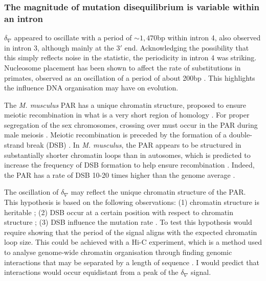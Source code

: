 
\subsubsection{The magnitude of mutation disequilibrium is variable within an intron}

$\delta_\nabla$ appeared to oscillate with a period of $\sim1,470$bp within intron 4, also observed in intron 3, although mainly at the $3'$ end. Acknowledging the possibility that this simply reflects noise in the statistic, the periodicity in intron 4 was striking. Nucleosome placement has been shown to affect the rate of substitutions in primates, observed as an oscillation of a period of about 200bp \citep{Ying2010EvidenceRepair}. This highlights the influence DNA organisation may have on evolution. 

The \textit{M. musculus} PAR has a unique chromatin structure, proposed to ensure meiotic recombination in what is a very short region of homology \citep{Kauppi2011DistinctMeiosis}. For proper segregation of the sex chromosomes, crossing over must occur in the PAR during male meiosis \citep{Burgoyne1982GeneticMammals, Ellis1989TheRegion, Rappold1993TheChromosomes}. Meiotic recombination is preceded by the formation of a double-strand break (DSB) \citep{Keeney2001MechanismInitiation}. In \textit{M. musculus}, the PAR appears to be structured in substantially shorter chromatin loops than in autosomes, which is predicted to increase the frequency of DSB formation to help ensure recombination \citep{Kauppi2011DistinctMeiosis, Acquaviva2020EnsuringRegion}. Indeed, the PAR has a rate of DSB 10-20 times higher than the genome average \citep{Kauppi2011DistinctMeiosis}. 

The oscillation of $\delta_\nabla$ may reflect the unique chromatin structure of the PAR. This hypothesis is based on the following observations: (1) chromatin structure is heritable \citep{Grewal2003HeterochromatinExpression, Beisel2011SilencingMechanisms}; (2) DSB occur at a certain position with respect to chromatin structure \citep{Ohta1994ChangesMeiosis., Wu1994Meiosis-inducedStructure}; (3) DSB influence the mutation rate \citep{Cannan2016MechanismsChromatin}. To test this hypothesis would require showing that the period of the signal aligns with the expected chromatin loop size. This could be achieved with a Hi-C experiment, which is a method used to analyse genome-wide chromatin organisation through finding genomic interactions that may be separated by a length of sequence \citep{Lieberman-Aiden2009ComprehensiveGenome}. I would predict that interactions would occur equidistant from a peak of the $\delta_\nabla$ signal.

